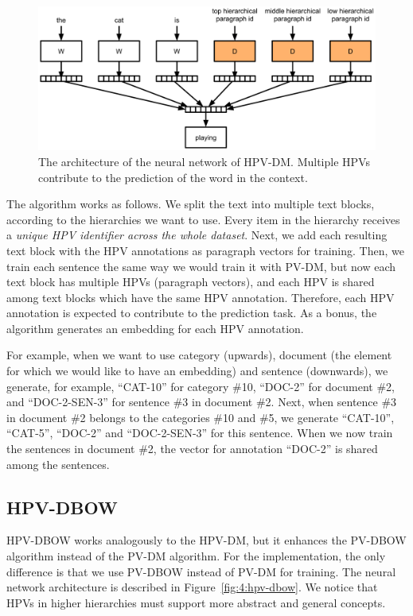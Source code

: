 \begin{figure}
	\centering
	\includegraphics[width=1.0\textwidth]{4hpvs/hpv-dm.png}
	\caption{The architecture of the neural network of HPV-DM\@. Multiple HPVs contribute to the prediction of the word in the context.}
	\label{fig:4:hpv-dm}
\end{figure}

The algorithm works as follows. We split the text into multiple text blocks, according to the hierarchies we want to use. Every item in the hierarchy receives a \emph{unique HPV identifier across the whole dataset}. Next, we add each resulting text block with the HPV annotations as paragraph vectors for training. Then, we train each sentence the same way we would train it with PV-DM, but now each text block has multiple HPVs (paragraph vectors), and each HPV is shared among text blocks which have the same HPV annotation. Therefore, each HPV annotation is expected to contribute to the prediction task. As a bonus, the algorithm generates an embedding for each HPV annotation.


For example, when we want to use category (upwards), document (the element for which we would like to have an embedding) and sentence (downwards), we generate, for example, ``CAT-10'' for category \#10, ``DOC-2'' for document \#2, and ``DOC-2-SEN-3'' for sentence \#3 in document \#2. Next, when sentence \#3 in document \#2 belongs to the categories \#10 and \#5, we generate ``CAT-10'', ``CAT-5'', ``DOC-2'' and ``DOC-2-SEN-3'' for this sentence. When we now train the sentences in document \#2, the vector for annotation ``DOC-2'' is shared among the sentences.

\subsection{HPV-DBOW}\label{hpv-dbow}

HPV-DBOW works analogously to the HPV-DM, but it enhances the PV-DBOW algorithm instead of the PV-DM algorithm. For the implementation, the only difference is that we use PV-DBOW instead of PV-DM for training. The neural network architecture is described in Figure~\ref{fig:4:hpv-dbow}. We notice that HPVs in higher hierarchies must support more abstract and general concepts.

